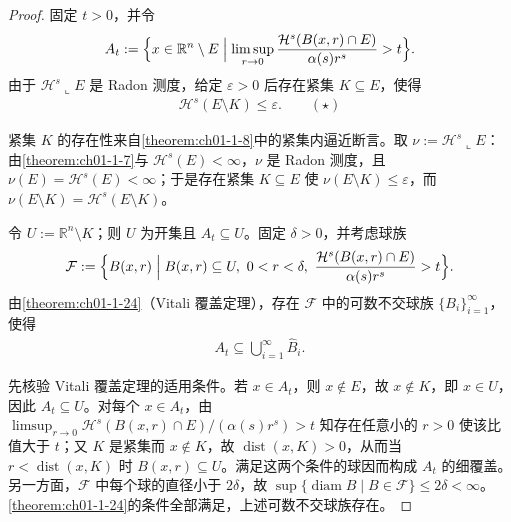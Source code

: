 \documentclass[../../main.tex]{subfiles}%
\begin{document}
\begin{proof}
固定 $t>0$，并令
\begin{align*}
A_t:=\Bigl\{x\in\mathbb{R}^n\setminus E\Bigm|\limsup_{r\to0}\frac{\mathcal{H}^s(B(x,r)\cap E)}{\alpha(s)r^s}>t\Bigr\} .
\end{align*}
由于 $\mathcal{H}^s\llcorner E$ 是 Radon 测度，给定 $\varepsilon>0$ 后存在紧集 $K\subseteq E$，使得
\begin{align*}
\mathcal{H}^s(E\setminus K)\leqslant\varepsilon . \qquad(\star)
\end{align*}

紧集 $K$ 的存在性来自\cref{theorem:ch01-1-8}中的紧集内逼近断言。取 $\nu:=\mathcal{H}^s\llcorner E$：由\cref{theorem:ch01-1-7}与 $\mathcal{H}^s(E)<\infty$，$\nu$ 是 Radon 测度，且 $\nu(E)=\mathcal{H}^s(E)<\infty$；于是存在紧集 $K\subseteq E$ 使 $\nu(E\setminus K)\leqslant\varepsilon$，而 $\nu(E\setminus K)=\mathcal{H}^s(E\setminus K)$。%

令 $U:=\mathbb{R}^n\setminus K$；则 $U$ 为开集且 $A_t\subseteq U$。固定 $\delta>0$，并考虑球族
\begin{align*}
\mathcal{F}:=\Bigl\{B(x,r)\Bigm|B(x,r)\subseteq U,\ 0<r<\delta,\ \frac{\mathcal{H}^s(B(x,r)\cap E)}{\alpha(s)r^s}>t\Bigr\} .
\end{align*}
由\cref{theorem:ch01-1-24}（Vitali 覆盖定理），存在 $\mathcal{F}$ 中的可数不交球族 $\{B_i\}_{i=1}^{\infty}$，使得%
\begin{align*}
A_t\subseteq\bigcup_{i=1}^{\infty}\hat B_i .
\end{align*}

先核验 Vitali 覆盖定理的适用条件。若 $x\in A_t$，则 $x\notin E$，故 $x\notin K$，即 $x\in U$，因此 $A_t\subseteq U$。对每个 $x\in A_t$，由 $\limsup_{r\to0}\mathcal{H}^s(B(x,r)\cap E)/(\alpha(s)r^s)>t$ 知存在任意小的 $r>0$ 使该比值大于 $t$；又 $K$ 是紧集而 $x\notin K$，故 $\operatorname{dist}(x,K)>0$，从而当 $r<\operatorname{dist}(x,K)$ 时 $B(x,r)\subseteq U$。满足这两个条件的球因而构成 $A_t$ 的细覆盖。另一方面，$\mathcal{F}$ 中每个球的直径小于 $2\delta$，故 $\sup\{\operatorname{diam}B\mid B\in\mathcal{F}\}\leqslant2\delta<\infty$。\cref{theorem:ch01-1-24}的条件全部满足，上述可数不交球族存在。%


\end{proof}
\end{document}
